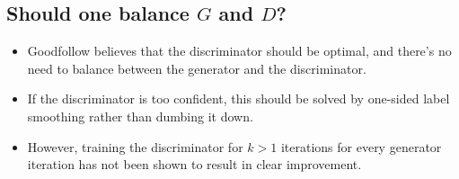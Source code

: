 \documentclass[10pt]{article}
\begin{document}
  \subsection{Should one balance $G$ and $D$?}

  \begin{itemize}
    \item Goodfollow believes that the discriminator should be optimal, and there's no need to balance between the generator and the discriminator.

    \item If the discriminator is too confident, this should be solved by one-sided label smoothing rather than dumbing it down.

    \item However, training the discriminator for $k > 1$ iterations for every generator iteration has not been shown to result in clear improvement.
  \end{itemize}

  
    
\end{document}
